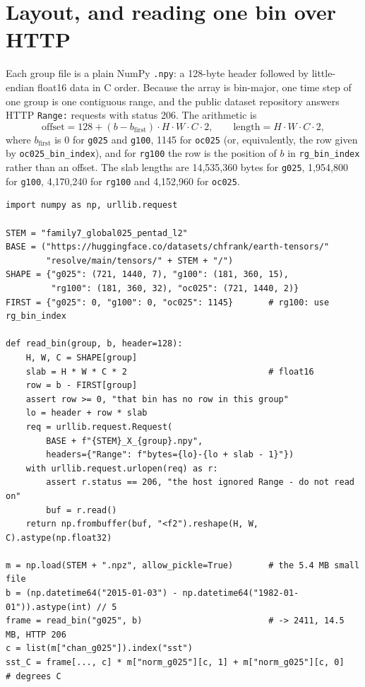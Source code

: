 \documentclass[10pt]{article}
\newcommand{\code}[1]{\texttt{#1}}
\begin{document}
\section{Layout, and reading one bin over HTTP}

Each group file is a plain NumPy \code{.npy}: a 128-byte header followed by
little-endian float16 data in C order. Because the array is bin-major, one
time step of one group is one contiguous range, and the public dataset
repository answers HTTP \code{Range:} requests with status 206. The arithmetic
is
\begin{equation}
\text{offset} = 128 + (b - b_{\text{first}})\cdot H\cdot W\cdot C\cdot 2,
\qquad \text{length} = H\cdot W\cdot C\cdot 2 ,
\end{equation}
where $b_{\text{first}}$ is 0 for \code{g025} and \code{g100}, 1145 for
\code{oc025} (or, equivalently, the row given by \code{oc025\_bin\_index}),
and for \code{rg100} the row is the position of $b$ in \code{rg\_bin\_index}
rather than an offset. The slab lengths are 14,535,360 bytes for \code{g025},
1,954,800 for \code{g100}, 4,170,240 for \code{rg100} and 4,152,960 for
\code{oc025}.

\begin{verbatim}
import numpy as np, urllib.request

STEM = "family7_global025_pentad_l2"
BASE = ("https://huggingface.co/datasets/chfrank/earth-tensors/"
        "resolve/main/tensors/" + STEM + "/")
SHAPE = {"g025": (721, 1440, 7), "g100": (181, 360, 15),
         "rg100": (181, 360, 32), "oc025": (721, 1440, 2)}
FIRST = {"g025": 0, "g100": 0, "oc025": 1145}       # rg100: use rg_bin_index

def read_bin(group, b, header=128):
    H, W, C = SHAPE[group]
    slab = H * W * C * 2                            # float16
    row = b - FIRST[group]
    assert row >= 0, "that bin has no row in this group"
    lo = header + row * slab
    req = urllib.request.Request(
        BASE + f"{STEM}_X_{group}.npy",
        headers={"Range": f"bytes={lo}-{lo + slab - 1}"})
    with urllib.request.urlopen(req) as r:
        assert r.status == 206, "the host ignored Range - do not read on"
        buf = r.read()
    return np.frombuffer(buf, "<f2").reshape(H, W, C).astype(np.float32)

m = np.load(STEM + ".npz", allow_pickle=True)       # the 5.4 MB small file
b = (np.datetime64("2015-01-03") - np.datetime64("1982-01-01")).astype(int) // 5
frame = read_bin("g025", b)                         # -> 2411, 14.5 MB, HTTP 206
c = list(m["chan_g025"]).index("sst")
sst_C = frame[..., c] * m["norm_g025"][c, 1] + m["norm_g025"][c, 0]   # degrees C
\end{verbatim}
\end{document}
